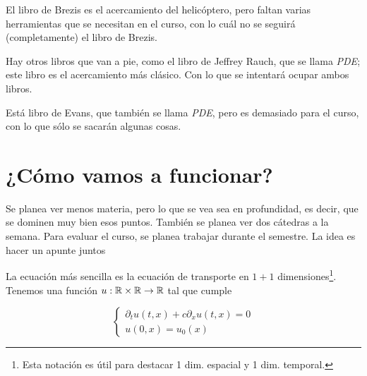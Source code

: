 El libro de Brezis es el acercamiento del helicóptero, pero faltan varias herramientas que se necesitan en el curso, con lo cuál no se seguirá (completamente) el libro de Brezis.

Hay otros libros que van a pie, como el libro de Jeffrey Rauch, que se llama \textit{PDE}; este libro es el acercamiento más clásico. Con lo que se intentará ocupar ambos libros. 

Está libro de Evans, que también se llama \textit{PDE}, pero es demasiado para el curso, con lo que sólo se sacarán algunas cosas.

\section{¿Cómo vamos a funcionar?}

Se planea ver menos materia, pero lo que se vea sea en profundidad, es decir, que se dominen muy bien esos puntos. También se planea ver dos cátedras a la semana. Para evaluar el curso, se planea trabajar durante el semestre. La idea es hacer un apunte juntos












\begin{example}

\end{example}
La ecuación más sencilla es la ecuación de transporte en $1 + 1$ dimensiones\footnote{Esta notación es útil para destacar 1 dim. espacial y 1 dim. temporal.}. Tenemos una función $u:\mathbb{R}\times\mathbb{R} \to \mathbb{R}$ tal que cumple

\begin{equation}
\left\{
\begin{array}{l}
    \partial_t u(t, x) + c \partial_x u(t, x) = 0 \\
    u(0, x) = u_0(x)
\end{array}
\right.
\end{equation}

